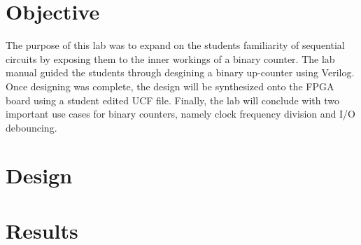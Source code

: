 \documentclass[a4paper,12pt]{article}
\begin{document}
\section*{Objective}

  \hspace{15pt}The purpose of this lab was to expand on the students familiarity of sequential circuits
  by exposing them to the inner workings of a binary counter. The lab manual guided the students
  through desgining a binary up-counter using Verilog. Once designing was complete, the design
  will be synthesized onto the FPGA board using a student edited UCF file. Finally, the lab
  will conclude with two important use cases for binary counters, namely clock frequency division
  and I/O debouncing.

\section*{Design}

  

  

  

  

  

%   
%
%   

  

\section*{Results}
\end{document}
